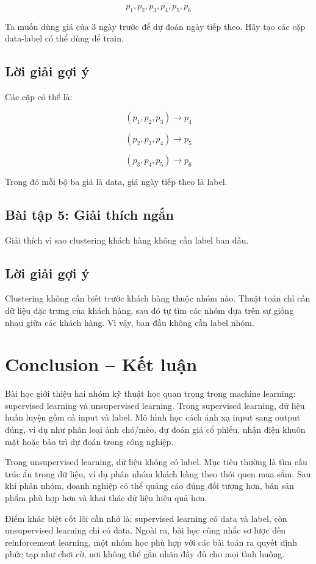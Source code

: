 \[
    p_1,p_2,p_3,p_4,p_5,p_6
\]

Ta muốn dùng giá của 3 ngày trước để dự đoán ngày tiếp theo. Hãy tạo các cặp data-label có thể dùng để train.

\subsection*{Lời giải gợi ý}

Các cặp có thể là:

\[
    (p_1,p_2,p_3) \rightarrow p_4
\]

\[
    (p_2,p_3,p_4) \rightarrow p_5
\]

\[
    (p_3,p_4,p_5) \rightarrow p_6
\]

Trong đó mỗi bộ ba giá là data, giá ngày tiếp theo là label.

\subsection*{Bài tập 5: Giải thích ngắn}

Giải thích vì sao clustering khách hàng không cần label ban đầu.

\subsection*{Lời giải gợi ý}

Clustering không cần biết trước khách hàng thuộc nhóm nào. Thuật toán chỉ cần dữ liệu đặc trưng của khách hàng, sau đó tự tìm các nhóm dựa trên sự giống nhau giữa các khách hàng. Vì vậy, ban đầu không cần label nhóm.

\section*{Conclusion -- Kết luận}

Bài học giới thiệu hai nhóm kỹ thuật học quan trọng trong machine learning: supervised learning và unsupervised learning. Trong supervised learning, dữ liệu huấn luyện gồm cả input và label. Mô hình học cách ánh xạ input sang output đúng, ví dụ như phân loại ảnh chó/mèo, dự đoán giá cổ phiếu, nhận diện khuôn mặt hoặc bảo trì dự đoán trong công nghiệp.

Trong unsupervised learning, dữ liệu không có label. Mục tiêu thường là tìm cấu trúc ẩn trong dữ liệu, ví dụ phân nhóm khách hàng theo thói quen mua sắm. Sau khi phân nhóm, doanh nghiệp có thể quảng cáo đúng đối tượng hơn, bán sản phẩm phù hợp hơn và khai thác dữ liệu hiệu quả hơn.

Điểm khác biệt cốt lõi cần nhớ là: supervised learning có data và label, còn unsupervised learning chỉ có data. Ngoài ra, bài học cũng nhắc sơ lược đến reinforcement learning, một nhóm học phù hợp với các bài toán ra quyết định phức tạp như chơi cờ, nơi không thể gắn nhãn đầy đủ cho mọi tình huống.